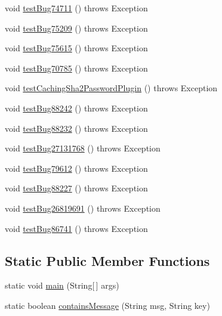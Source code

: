 \begin{DoxyCompactItemize}
\item 
void \mbox{\hyperlink{classtestsuite_1_1regression_1_1_connection_regression_test_a9c03aad693cf9263c8523b7d3c65f223}{test\+Bug74711}} ()  throws Exception 
\item 
void \mbox{\hyperlink{classtestsuite_1_1regression_1_1_connection_regression_test_a0cc242ab6f5c5f0c1bb19d14d37bb866}{test\+Bug75209}} ()  throws Exception 
\item 
void \mbox{\hyperlink{classtestsuite_1_1regression_1_1_connection_regression_test_a7f267194efdf847a2f291c1831abcde6}{test\+Bug75615}} ()  throws Exception 
\item 
void \mbox{\hyperlink{classtestsuite_1_1regression_1_1_connection_regression_test_a2e9ffad8504db4b26677d74c5f5b0a65}{test\+Bug70785}} ()  throws Exception 
\item 
void \mbox{\hyperlink{classtestsuite_1_1regression_1_1_connection_regression_test_a263450ae42667048cb087d436159096d}{test\+Caching\+Sha2\+Password\+Plugin}} ()  throws Exception 
\item 
void \mbox{\hyperlink{classtestsuite_1_1regression_1_1_connection_regression_test_a55b53a4466ee01be0e4523d8f8ad0fb9}{test\+Bug88242}} ()  throws Exception 
\item 
void \mbox{\hyperlink{classtestsuite_1_1regression_1_1_connection_regression_test_a8f012d97b51e3128e7e1077cb0735a77}{test\+Bug88232}} ()  throws Exception 
\item 
void \mbox{\hyperlink{classtestsuite_1_1regression_1_1_connection_regression_test_a460de861e61f26582dca4e5b65fc267c}{test\+Bug27131768}} ()  throws Exception 
\item 
void \mbox{\hyperlink{classtestsuite_1_1regression_1_1_connection_regression_test_ab8f8f7ed64d0a02e23c0ed5ebafc2fbc}{test\+Bug79612}} ()  throws Exception 
\item 
void \mbox{\hyperlink{classtestsuite_1_1regression_1_1_connection_regression_test_aa96e95ebbaaac4aad6e1bbc4df86bede}{test\+Bug88227}} ()  throws Exception 
\item 
void \mbox{\hyperlink{classtestsuite_1_1regression_1_1_connection_regression_test_af42d87028dfc5fe504f1cf4457c21d53}{test\+Bug26819691}} ()  throws Exception 
\item 
void \mbox{\hyperlink{classtestsuite_1_1regression_1_1_connection_regression_test_a918e9c3c8af63f994256ad99ebe9898d}{test\+Bug86741}} ()  throws Exception 
\end{DoxyCompactItemize}
\subsection*{Static Public Member Functions}
\begin{DoxyCompactItemize}
\item 
static void \mbox{\hyperlink{classtestsuite_1_1regression_1_1_connection_regression_test_a07f235ef52b2330590e2069478598e41}{main}} (String\mbox{[}$\,$\mbox{]} args)
\item 
static boolean \mbox{\hyperlink{classtestsuite_1_1regression_1_1_connection_regression_test_ac9b394063b52338bbdb0a9666b6aca23}{contains\+Message}} (String msg, String key)
\end{DoxyCompactItemize}
